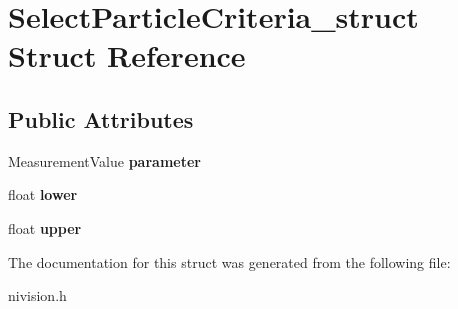 \hypertarget{structSelectParticleCriteria__struct}{\section{\-Select\-Particle\-Criteria\-\_\-struct \-Struct \-Reference}
\label{structSelectParticleCriteria__struct}
}
\subsection*{\-Public \-Attributes}
\begin{DoxyCompactItemize}
\item 
\hypertarget{structSelectParticleCriteria__struct_a2593af3072aaea2b384ae165ece756a4}{\-Measurement\-Value {\bfseries parameter}}\label{structSelectParticleCriteria__struct_a2593af3072aaea2b384ae165ece756a4}

\item 
\hypertarget{structSelectParticleCriteria__struct_a56514b0e8174f174236551c0510c1fff}{float {\bfseries lower}}\label{structSelectParticleCriteria__struct_a56514b0e8174f174236551c0510c1fff}

\item 
\hypertarget{structSelectParticleCriteria__struct_a2488971f38c35de53edef0dc7830fc01}{float {\bfseries upper}}\label{structSelectParticleCriteria__struct_a2488971f38c35de53edef0dc7830fc01}

\end{DoxyCompactItemize}


\-The documentation for this struct was generated from the following file\-:\begin{DoxyCompactItemize}
\item 
nivision.\-h\end{DoxyCompactItemize}

